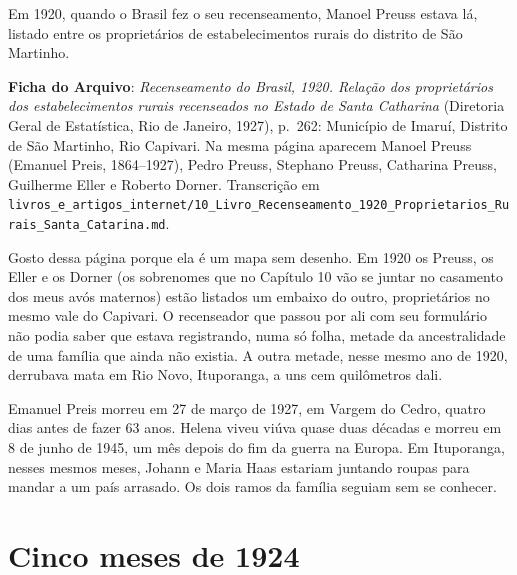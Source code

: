 \documentclass[
  brazilian,
  11pt,
  openany]{book}
\begin{document}
Em 1920, quando o Brasil fez o seu recenseamento, Manoel Preuss estava
lá, listado entre os proprietários de estabelecimentos rurais do
distrito de São Martinho.

\begin{ficha}

\textbf{Ficha do Arquivo}: \emph{Recenseamento do Brasil, 1920. Relação
dos proprietários dos estabelecimentos rurais recenseados no Estado de
Santa Catharina} (Diretoria Geral de Estatística, Rio de Janeiro, 1927),
p.~262: Município de Imaruí, Distrito de São Martinho, Rio Capivari. Na
mesma página aparecem Manoel Preuss (Emanuel Preis, 1864--1927), Pedro
Preuss, Stephano Preuss, Catharina Preuss, Guilherme Eller e Roberto
Dorner. Transcrição em
\texttt{livros\_e\_artigos\_internet/10\_Livro\_Recenseamento\_1920\_Proprietarios\_Rurais\_Santa\_Catarina.md}.

\end{ficha}

Gosto dessa página porque ela é um mapa sem desenho. Em 1920 os Preuss,
os Eller e os Dorner (os sobrenomes que no Capítulo 10 vão se juntar no
casamento dos meus avós maternos) estão listados um embaixo do outro,
proprietários no mesmo vale do Capivari. O recenseador que passou por
ali com seu formulário não podia saber que estava registrando, numa só
folha, metade da ancestralidade de uma família que ainda não existia. A
outra metade, nesse mesmo ano de 1920, derrubava mata em Rio Novo,
Ituporanga, a uns cem quilômetros dali.

Emanuel Preis morreu em 27 de março de 1927, em Vargem do Cedro, quatro
dias antes de fazer 63 anos. Helena viveu viúva quase duas décadas e
morreu em 8 de junho de 1945, um mês depois do fim da guerra na Europa.
Em Ituporanga, nesses mesmos meses, Johann e Maria Haas estariam
juntando roupas para mandar a um país arrasado. Os dois ramos da família
seguiam sem se conhecer.

\section{Cinco meses de 1924}\label{cinco-meses-de-1924}
\end{document}
